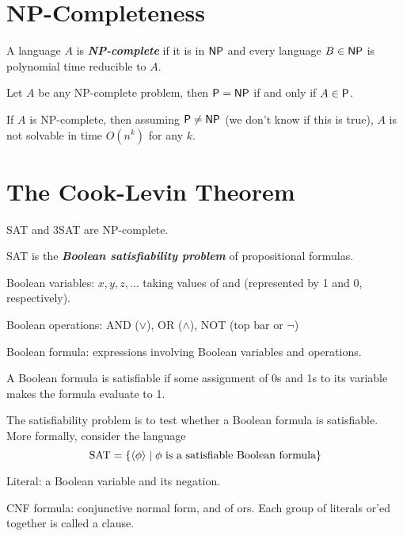 \section{NP-Completeness}

\vspace{\parskip}

\begin{definition}[NP-complete] 
    A language $A$ is \textit{\textbf{NP-complete}} if it is in $\mathsf{NP}$ and every language $B \in \mathsf{NP}$ is polynomial time reducible to $A$. 
\end{definition}

Let $A$ be any NP-complete problem, then $\mathsf{P} = \mathsf{NP}$ if and only if $A \in \mathsf{P}$.

If $A$ is NP-complete, then assuming $\mathsf{P} \neq \mathsf{NP}$ (we don't know if this is true), $A$ is not solvable in time $O(n^k)$ for any $k$.

\section{The Cook-Levin Theorem}

\vspace{\parskip}

\begin{theorem}
    SAT and 3SAT are NP-complete.
\end{theorem}

SAT is the \textit{\textbf{Boolean satisfiability problem}} of propositional formulas.

Boolean variables: $x,y,z,\ldots$ taking values of  and  (represented by 1 and 0, respectively).

Boolean operations: AND ($\vee$), OR ($\wedge$), NOT (top bar or $\neg$)

Boolean formula: expressions involving Boolean variables and operations.

A Boolean formula is satisfiable if some assignment of 0s and 1s to its variable makes the formula evaluate to 1.

The satisfiability problem is to test whether a Boolean formula is satisfiable. More formally, consider the language
$$
\mathrm{SAT} = \{ \langle \phi \rangle \mid \text{$\phi$ is a satisfiable Boolean formula}\}
$$

Literal: a Boolean variable and its negation.

CNF formula: conjunctive normal form, and of ors. Each group of literals or'ed together is called a clause.

